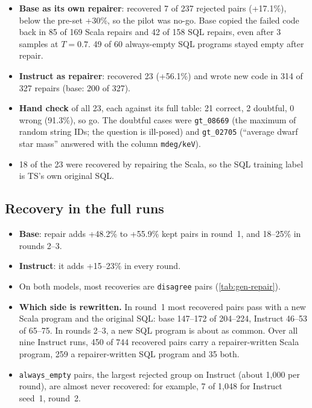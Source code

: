 

\begin{observation}
\begin{itemize}
\item \textbf{Base as its own repairer}: recovered 7 of 237 rejected pairs (+17.1\%), below the pre-set +30\%, so the
pilot was no-go. Base copied the failed code back in 85 of 169 Scala repairs and 42 of 158 SQL repairs, even after 3
samples at $T=0.7$. 49 of 60 always-empty SQL programs stayed empty after repair.
\item \textbf{Instruct as repairer}: recovered 23 (+56.1\%) and wrote new code in 314 of 327 repairs (base: 200 of
327).
\item \textbf{Hand check} of all 23, each against its full table: 21 correct, 2 doubtful, 0 wrong (91.3\%), so go. The
doubtful cases were \texttt{gt\_08669} (the maximum of random string IDs; the question is ill-posed) and
\texttt{gt\_02705} (``average dwarf star mass'' answered with the column \texttt{mdeg/keV}).
\item 18 of the 23 were recovered by repairing the Scala, so the SQL training label is TS's own original SQL.
\end{itemize}
\end{observation}

\subsection{Recovery in the full runs}



\begin{observation}
\begin{itemize}
\item \textbf{Base}: repair adds +48.2\% to +55.9\% kept pairs in round~1, and 18--25\% in rounds 2--3.
\item \textbf{Instruct}: it adds +15--23\% in every round.
\item On both models, most recoveries are \texttt{disagree} pairs (\cref{tab:gen-repair}).
\item \textbf{Which side is rewritten.} In round~1 most recovered pairs pass with a new Scala program and the
original SQL: base 147--172 of 204--224, Instruct 46--53 of 65--75. In rounds 2--3, a new SQL program is about as
common. Over all nine Instruct runs, 450 of 744 recovered pairs carry a repairer-written Scala program, 259 a
repairer-written SQL program and 35 both.
\item \texttt{always\_empty} pairs, the largest rejected group on Instruct (about 1,000 per round), are almost never
recovered: for example, 7 of 1,048 for Instruct seed~1, round~2.
\end{itemize}
\end{observation}

